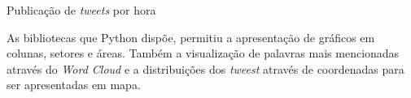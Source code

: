 \begin{grafico}[h!]
	\centering
	\vspace{-0.2cm}
	\caption{Publicação de \textit{tweets} por hora}
	\label{time}
\end{grafico}

As bibliotecas que Python dispõe, permitiu a apresentação de gráficos em colunas, setores e áreas. Também a visualização de palavras mais mencionadas através do \textit{Word Cloud} e a distribuições dos \textit{tweest} através de coordenadas para ser apresentadas em mapa.







